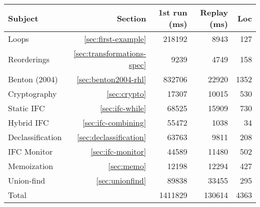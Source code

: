 
\begin{tabular}{|l|r|r|r|r|}
\hline
Subject&Section&1st run (ms)&Replay (ms)&Loc
\\\hline
Loops&{\ref{sec:first-example}}&218192&8943&127\\
Reorderings&{\ref{sec:transformations-spec}}&9239&4749&158\\
Benton (2004)&{\ref{sec:benton2004-rhl}}&832706&22920&1352\\
Cryptography&{\ref{sec:crypto}}&17307&10015&530\\
Static IFC&{\ref{sec:ifc-while}}&68525&15909&730\\
Hybrid IFC&{\ref{sec:ifc-combining}}&55472&1038&34\\
Declassification&\ifcamera{*}\else\ref{sec:declassification}\fi&63763&9811&208\\
IFC Monitor&\ifcamera{*}\else\ref{sec:ifc-monitor}\fi&44589&11480&502\\
Memoization&{\ref{sec:memo}}&12198&12294&427\\
Union-find&{\ref{sec:unionfind}}&89838&33455&295\\
\hline Total&&1411829&130614&4363\\\hline
\end{tabular}

